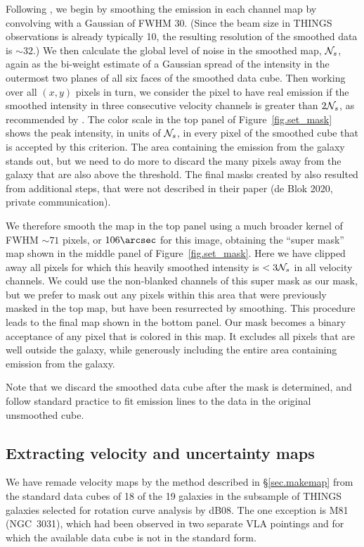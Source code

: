 \documentclass[letterpaper,fleqn,usenatbib]{mnras}
\begin{document}
Following \citet{Wa08}, we begin by smoothing the emission in each
channel map by convolving with a Gaussian of FWHM 30\arcsec.  (Since
the beam size in THINGS observations is already typically 10\arcsec,
the resulting resolution of the smoothed data is $\sim 32$\arcsec.)
We then calculate the global level of noise in the smoothed map,
${\cal N}_s$, again as the bi-weight estimate of a Gaussian spread of
the intensity in the outermost two planes of all six faces of the
smoothed data cube.  Then working over all $(x,y)$ pixels in turn, we
consider the pixel to have real emission if the smoothed intensity in
three consecutive velocity channels is greater than $2{\cal N}_s$, as
recommended by \citet{Wa08}.  The color scale in the top panel of
Figure~\ref{fig.set_mask} shows the peak intensity, in units of ${\cal
  N}_s$, in every pixel of the smoothed cube that is accepted by this
criterion.  The area containing the emission from the galaxy stands
out, but we need to do more to discard the many pixels away from the
galaxy that are also above the threshold.  The final masks created by
\citet{Wa08} also resulted from additional steps, that were not
described in their paper (de Blok 2020, private communication).

We therefore smooth the map in the top panel using a much broader
kernel of FWHM $\sim 71$ pixels, or $106\arcsec$ for this image,
obtaining the ``super mask'' map shown in the middle panel of
Figure~\ref{fig.set_mask}.  Here we have clipped away all pixels for
which this heavily smoothed intensity is $<3{\cal N}_s$ in all
velocity channels.  We could use the non-blanked channels of this
super mask as our mask, but we prefer to mask out any pixels within
this area that were previously masked in the top map, but have been
resurrected by smoothing.  This procedure leads to the final map shown
in the bottom panel.  Our mask becomes a binary acceptance of any
pixel that is colored in this map.  It excludes all pixels that are
well outside the galaxy, while generously including the entire area
containing emission from the galaxy.

Note that we discard the smoothed data cube after the mask is
determined, and follow standard practice to fit emission lines to the
data in the original unsmoothed cube.

\subsection{Extracting velocity and uncertainty maps}
\label{sec.getmaps}
We have remade velocity maps by the method described in
\S\ref{sec.makemap} from the standard data cubes of 18 of the 19
galaxies in the subsample of THINGS galaxies selected for rotation
curve analysis by dB08.  The one exception is M81 (NGC~3031), which
had been observed in two separate VLA pointings and for which the
available data cube is not in the standard form.
\end{document}
